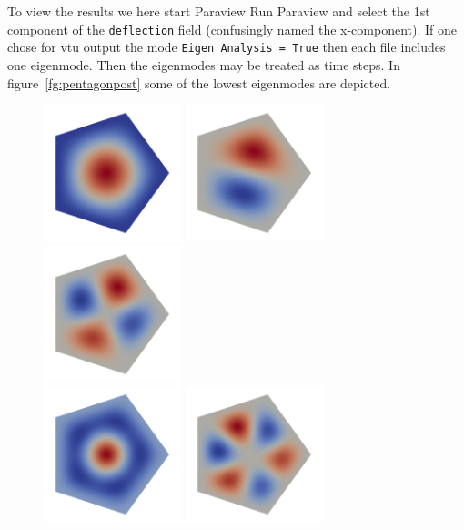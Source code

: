 To view the results we here start Paraview
\ttbegin
Run
  Paraview
\ttend
and select the 1st component of the \texttt{deflection} field
(confusingly named the x-component). 
If one chose for vtu output the mode \texttt{Eigen Analysis = True} then each file includes
one eigenmode. Then the eigenmodes may be treated as time steps. 
In figure~\ref{fg:pentagonpost} some of the lowest eigenmodes are depicted.
\begin{figure}
  \begin{center}
\includegraphics[width=40mm]{mode1}
\includegraphics[width=40mm]{mode2}
\includegraphics[width=40mm]{mode4} \\
\includegraphics[width=40mm]{mode6}
\includegraphics[width=40mm]{mode7}

\end{center}
\end{figure}

